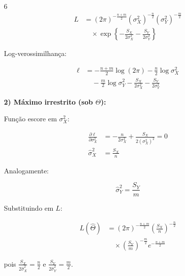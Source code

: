 \documentclass[8pt, a4paper, landscape]{extarticle}
\begin{document}
\begin{multicols}{6}
\begin{equation*}
\begin{split}
L &= (2\pi)^{-\frac{n+m}{2}}(\sigma_X^2)^{-\frac{n}{2}}(\sigma_Y^2)^{-\frac{m}{2}} \\
&\quad \times \exp\left\{-\frac{S_X}{2\sigma_X^2}-\frac{S_Y}{2\sigma_Y^2}\right\}
\end{split}
\end{equation*}

Log-verossimilhança:

\begin{equation*}
\begin{split}
\ell &= -\frac{n+m}{2}\log(2\pi) - \frac{n}{2}\log\sigma_X^2 \\
&\quad - \frac{m}{2}\log\sigma_Y^2 - \frac{S_X}{2\sigma_X^2} - \frac{S_Y}{2\sigma_Y^2}
\end{split}
\end{equation*}

\vspace{0.2cm}

\textbf{2) Máximo irrestrito (sob $\Theta$):}

Função escore em $\sigma_X^2$:

\begin{equation*}
\begin{split}
\frac{\partial\ell}{\partial\sigma_X^2} &= -\frac{n}{2\sigma_X^2} + \frac{S_X}{2(\sigma_X^2)^2} = 0 \\
\hat{\sigma}_X^2 &= \frac{S_X}{n}
\end{split}
\end{equation*}

Analogamente:

\begin{equation*}
\hat{\sigma}_Y^2 = \frac{S_Y}{m}
\end{equation*}

Substituindo em $L$:

\begin{equation*}
\begin{split}
L(\hat{\Theta}) &= (2\pi)^{-\frac{n+m}{2}}\left(\frac{S_X}{n}\right)^{-\frac{n}{2}} \\
&\quad \times \left(\frac{S_Y}{m}\right)^{-\frac{m}{2}} e^{-\frac{n+m}{2}}
\end{split}
\end{equation*}

pois $\frac{S_X}{2\hat{\sigma}_X^2} = \frac{n}{2}$ e $\frac{S_Y}{2\hat{\sigma}_Y^2} = \frac{m}{2}$.

\vspace{0.2cm}


\end{multicols}
\end{document}
